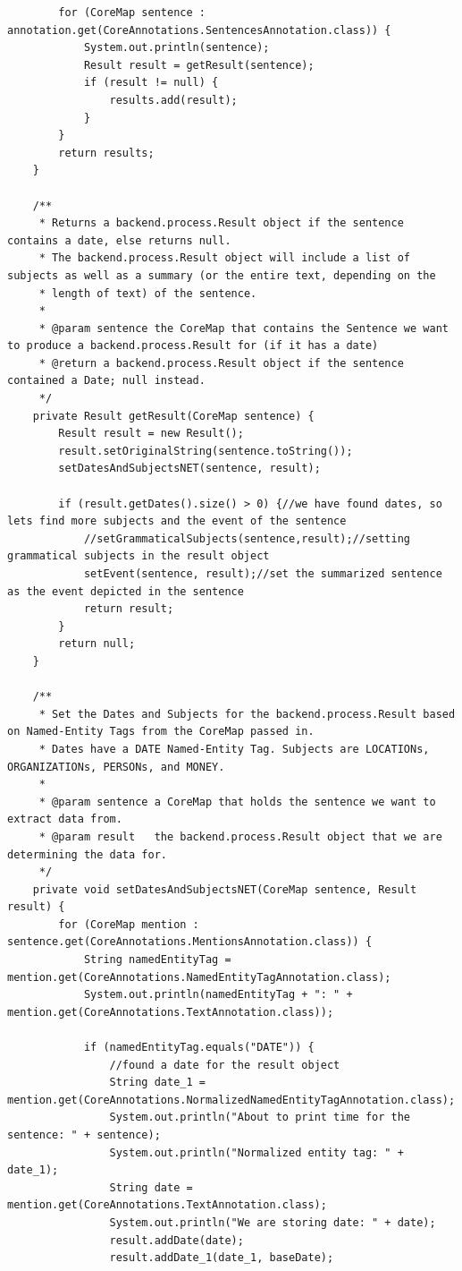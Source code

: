 \begin{lstlisting}
        for (CoreMap sentence : annotation.get(CoreAnnotations.SentencesAnnotation.class)) {
            System.out.println(sentence);
            Result result = getResult(sentence);
            if (result != null) {
                results.add(result);
            }
        }
        return results;
    }

    /**
     * Returns a backend.process.Result object if the sentence contains a date, else returns null.
     * The backend.process.Result object will include a list of subjects as well as a summary (or the entire text, depending on the
     * length of text) of the sentence.
     *
     * @param sentence the CoreMap that contains the Sentence we want to produce a backend.process.Result for (if it has a date)
     * @return a backend.process.Result object if the sentence contained a Date; null instead.
     */
    private Result getResult(CoreMap sentence) {
        Result result = new Result();
        result.setOriginalString(sentence.toString());
        setDatesAndSubjectsNET(sentence, result);

        if (result.getDates().size() > 0) {//we have found dates, so lets find more subjects and the event of the sentence
            //setGrammaticalSubjects(sentence,result);//setting grammatical subjects in the result object
            setEvent(sentence, result);//set the summarized sentence as the event depicted in the sentence
            return result;
        }
        return null;
    }

    /**
     * Set the Dates and Subjects for the backend.process.Result based on Named-Entity Tags from the CoreMap passed in.
     * Dates have a DATE Named-Entity Tag. Subjects are LOCATIONs, ORGANIZATIONs, PERSONs, and MONEY.
     *
     * @param sentence a CoreMap that holds the sentence we want to extract data from.
     * @param result   the backend.process.Result object that we are determining the data for.
     */
    private void setDatesAndSubjectsNET(CoreMap sentence, Result result) {
        for (CoreMap mention : sentence.get(CoreAnnotations.MentionsAnnotation.class)) {
            String namedEntityTag = mention.get(CoreAnnotations.NamedEntityTagAnnotation.class);
            System.out.println(namedEntityTag + ": " + mention.get(CoreAnnotations.TextAnnotation.class));

            if (namedEntityTag.equals("DATE")) {
                //found a date for the result object
                String date_1 = mention.get(CoreAnnotations.NormalizedNamedEntityTagAnnotation.class);
                System.out.println("About to print time for the sentence: " + sentence);
                System.out.println("Normalized entity tag: " + date_1);
                String date = mention.get(CoreAnnotations.TextAnnotation.class);
                System.out.println("We are storing date: " + date);
                result.addDate(date);
                result.addDate_1(date_1, baseDate);


\end{lstlisting}
